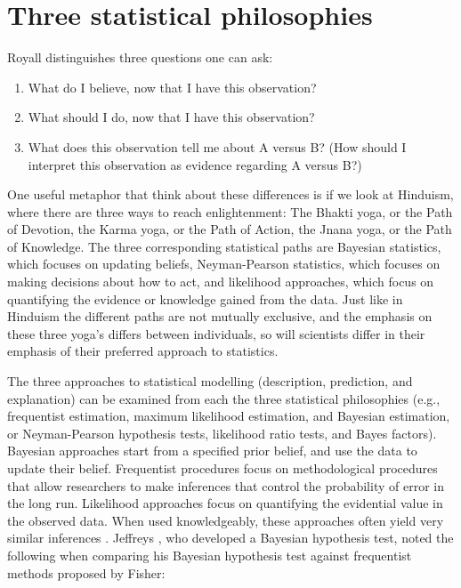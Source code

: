 \documentclass[
  oneside]{book}
\providecommand{\tightlist}{%
  \setlength{\itemsep}{0pt}\setlength{\parskip}{0pt}}
\begin{document}
\hypertarget{three-statistical-philosophies}{%
\section{Three statistical philosophies}\label{three-statistical-philosophies}}

Royall \citeyearpar{royall_statistical_1997} distinguishes three questions one can ask:

\begin{enumerate}
\def\labelenumi{\arabic{enumi}.}
\tightlist
\item
  What do I believe, now that I have this observation?
\item
  What should I do, now that I have this observation?
\item
  What does this observation tell me about A versus B? (How should I interpret this observation as evidence regarding A versus B?)
\end{enumerate}

One useful metaphor that think about these differences is if we look at Hinduism, where there are three ways to reach enlightenment: The Bhakti yoga, or the Path of Devotion, the Karma yoga, or the Path of Action, the Jnana yoga, or the Path of Knowledge. The three corresponding statistical paths are Bayesian statistics, which focuses on updating beliefs, Neyman-Pearson statistics, which focuses on making decisions about how to act, and likelihood approaches, which focus on quantifying the evidence or knowledge gained from the data. Just like in Hinduism the different paths are not mutually exclusive, and the emphasis on these three yoga's differs between individuals, so will scientists differ in their emphasis of their preferred approach to statistics.

The three approaches to statistical modelling (description, prediction, and explanation) can be examined from each the three statistical philosophies (e.g., frequentist estimation, maximum likelihood estimation, and Bayesian estimation, or Neyman-Pearson hypothesis tests, likelihood ratio tests, and Bayes factors). Bayesian approaches start from a specified prior belief, and use the data to update their belief. Frequentist procedures focus on methodological procedures that allow researchers to make inferences that control the probability of error in the long run. Likelihood approaches focus on quantifying the evidential value in the observed data. When used knowledgeably, these approaches often yield very similar inferences \citep{dongen_multiple_2019, lakens_improving_2020, tendeiro_review_2019}. Jeffreys \citeyearpar{jeffreys_theory_1939}, who developed a Bayesian hypothesis test, noted the following when comparing his Bayesian hypothesis test against frequentist methods proposed by Fisher:
\end{document}
